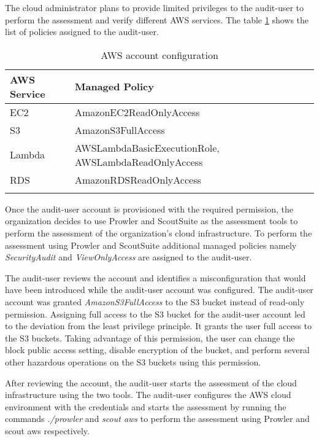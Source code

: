 The cloud administrator plans to provide limited privileges to the audit-user to perform the assessment and verify different AWS services.
The table \ref{tab:accountconfiguration} shows the list
of policies assigned to the audit-user.
\\
\begin{longtable}{|p{6cm}|p{8cm}|}
    \hline
    \textbf{AWS Service} & \textbf{Managed Policy}\\
    \hline
    EC2 & AmazonEC2ReadOnlyAccess \\
    \hline
    S3 & AmazonS3FullAccess \\
    \hline
    Lambda & AWSLambdaBasicExecutionRole,
    AWSLambdaReadOnlyAccess \\
    \hline
    RDS & AmazonRDSReadOnlyAccess \\
    \hline
    \caption{AWS account configuration}
    \label{tab:accountconfiguration}
\end{longtable}



\par Once the audit-user account is provisioned with the
required permission, the organization decides to
use Prowler and ScoutSuite as the assessment tools to perform the assessment of the organization’s cloud infrastructure.
To perform the assessment using Prowler and ScoutSuite additional managed policies namely \textit{SecurityAudit} and \textit{ViewOnlyAccess} are assigned to the audit-user.

\par The audit-user reviews the account and identifies a misconfiguration that would have been introduced while the audit-user account was configured.
The audit-user account was granted \textit{AmazonS3FullAccess} to the S3 bucket instead of read-only permission.
Assigning full access to the S3 bucket for the audit-user account led to the deviation from the least privilege principle.
It grants the user full access to the S3 buckets.
Taking advantage of this permission, the user can change the block public access setting, disable encryption of the bucket, and perform several other hazardous operations on the S3 buckets using this permission.

\par After reviewing the account, the audit-user starts the assessment of the cloud infrastructure using the two tools.
The audit-user configures the AWS cloud environment with the credentials and starts the assessment by running the commands \textit{./prowler} and \textit{scout aws} to perform the assessment using Prowler and scout aws respectively.

